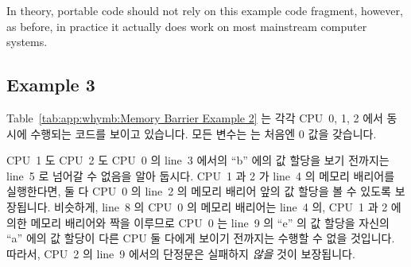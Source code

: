 In theory, portable code should not rely on this example code fragment,
however, as before, in practice it actually does work on most
mainstream computer systems.
\fi

\subsection{Example 3}
\label{sec:app:whymb:Example 3}

Table~\ref{tab:app:whymb:Memory Barrier Example 2} 는 각각 CPU~0, 1, 2 에서
동시에 수행되는 코드를 보이고 있습니다.
모든 변수는 는 처음엔 0 값을 갖습니다.

\begin{table}
\scriptsize
{}
\caption{Memory Barrier Example 3}
\label{tab:app:whymb:Memory Barrier Example 3}
\end{table}

CPU~1 도 CPU~2 도 CPU~0 의 line~3 에서의 ``b'' 에의 값 할당을 보기 전까지는
line~5 로 넘어갈 수 없음을 알아 둡시다.
CPU~1 과 2 가 line~4 의 메모리 배리어를 실행한다면, 둘 다 CPU~0 의 line~2 의
메모리 배리어 앞의 값 할당을 볼 수 있도록 보장됩니다.
비슷하게, line~8 의 CPU~0 의 메모리 배리어는 line~4 의, CPU~1 과 2 에 의한
메모리 배리어와 짝을 이루므로 CPU~0 는 line~9 의 ``e'' 의 값 할당을 자신의
``a'' 에의 값 할당이 다른 CPU 둘 다에게 보이기 전까지는 수행할 수 없을
것입니다.
따라서, CPU~2 의 line~9 에서의 단정문은 실패하지 \emph{않을} 것이 보장됩니다.
\iffalse

